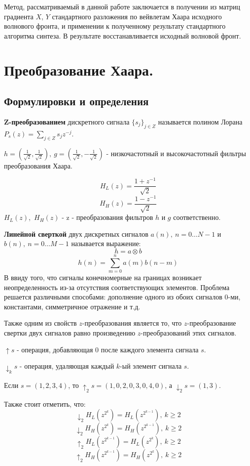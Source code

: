 \documentclass[oneside, final, 14pt]{article}
\begin{document}
Метод, рассматриваемый в данной работе заключается в получении из матриц градиента $X$, $Y$ стандартного разложения по вейвлетам Хаара исходного волнового фронта, и применении к полученному результату стандартного алгоритма синтеза. В результате восстанавливается исходный волновой фронт.


\section{Преобразование Хаара.}
\subsection{Формулировки и определения}
\textbf{Z-преобразованием} дискретного сигнала $\{s_j\}_{ j \in Z}$ называется полином Лорана 
$P_{s}(z) = \sum_{j \in Z} s_{j}z^{-j}$.

$h = (\frac{1}{\sqrt{2}}, \frac{1}{\sqrt{2}}),~g = (\frac{1}{\sqrt{2}}, -\frac{1}{\sqrt{2}})$ - низкочастотный и высокочастотный фильтры преобразования Хаара.

$$ H_{L}(z) = \frac{1 + z^{-1}}{\sqrt{2}} $$
$$ H_{H}(z) = \frac{1 - z^{-1}}{\sqrt{2}} $$
$H_{L}(z)$,~$H_{H}(z)$ - z - преобразования фильтров $h$ и $g$ соответственно.

\textbf{Линейной сверткой} двух дискретных сигналов $a(n),~ n=0 \ldots N-1$ и $b(n),~ n=0 \ldots M-1$ называется выражение:
$$ h = a \otimes b $$
$$ h(n) =  \sum_{m=0}^{n} a(m)b(n-m) $$
В ввиду того, что сигналы конечномерные на границах возникает неопределенность из-за отсутствия соответствующих элементов. Проблема решается различными способами: дополнение одного из обоих сигналов $0$-ми, константами, симметричное отражение и т.д.

Также одним из свойств $z$-преобразования является то, что $z$-преобразование свертки двух сигналов равно произведению $z$-преобразований этих сигналов. 

\textbf{$\uparrow s$} - операция, добавляющая $0$ после каждого элемента сигнала $s$.

\textbf{$\downarrow_k s$} - операция, удаляющая каждый $k$-ый элемент сигнала $s$.

Если $s = (1,2,3,4)$, то $\uparrow_2 s = (1,0,2,0,3,0,4,0)$, а $\downarrow_{2} s = (1,3)$.

Также стоит отметить, что:
$$\downarrow_2 H_L(z^{2^k}) = H_L(z^{2^{k-1}}),~ k\geq 2$$
$$\downarrow_2 H_H(z^{2^k}) = H_H(z^{2^{k-1}}),~ k\geq 2$$
$$\uparrow_2 H_L(z^{2^{k-1}}) = H_L(z^{2^{k}}),~ k\geq 2$$
$$\uparrow_2 H_H(z^{2^{k-1}}) = H_H(z^{2^{k}}),~ k\geq 2$$
\end{document}

